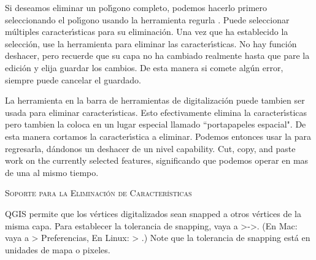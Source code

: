 
Si deseamos eliminar un pol\'{\i}gono completo, podemos hacerlo primero seleccionando 
el pol\'{\i}gono usando la herramienta regurla . Puede seleccionar 
m\'ultiples caracter\'{\i}sticas para su eliminaci\'on. Una vez que ha establecido la selecci\'on, use la 
herramienta  para eliminar las caracter\'{\i}sticas. No hay funci\'on deshacer, 
pero recuerde que su capa no ha cambiado realmente hasta que pare la edici\'on y elija 
guardar los cambios. De esta manera si comete alg\'un error, siempre puede cancelar el guardado.

La herramienta  en la barra de herramientas de digitalizaci\'on puede
tambien ser usada para eliminar caracter\'{\i}sticas. Esto efectivamente elimina la caracter\'{\i}sticas pero
tambien la coloca en un lugar especial llamado ``portapapeles espacial". De esta manera cortamos la caracter\'{\i}stica a eliminar. 
Podemos entonces usar la  para regresarla, d\'andonos un deshacer de un nivel 
capability. Cut, copy, and paste work on the currently selected features, 
significando que podemos operar en mas de una al mismo tiempo.

\begin{Tip}[ht]\caption{\textsc{Soporte para la Eliminaci\'on de Caracter\'{\i}sticas}}
\end{Tip}

QGIS permite que los v\'ertices digitalizados sean snapped a otros v\'ertices de la misma capa. Para 
establecer la tolerancia de snapping, vaya a
>->.
(En Mac: vaya a   > Preferencias, En Linux:  > .)
Note que la tolerancia de snapping est\'a en unidades de mapa o pixeles.


